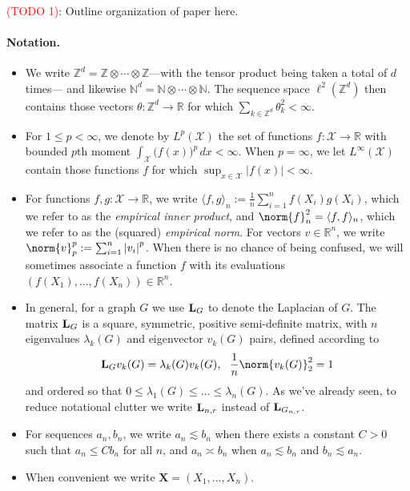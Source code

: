 \documentclass{article}
\newcommand{\Reals}{\mathbb{R}}
\newcommand{\abs}[1]{\left \lvert #1 \right \rvert}
\newcommand{\1}{\mathbf{1}}
\newcommand{\Lap}{{\bf L}}
\newcommand{\Xset}{\mathcal{X}}
\newcommand{\Leb}{L}
\newcommand{\dotp}[2]{\langle #1, #2 \rangle}
\theoremstyle{alden}
\theoremstyle{aldenthm}
\theoremstyle{definition}
\theoremstyle{remark}
\begin{document}
\textcolor{red}{(TODO 1)}: Outline organization of paper here. 

\paragraph{Notation.}
\begin{itemize}
	\item We write $\mathbb{Z}^d = \mathbb{Z} \otimes \cdots \otimes \mathbb{Z}$---with the tensor product being taken a total of $d$ times--- and likewise $\mathbb{N}^d = \mathbb{N} \otimes \cdots \otimes \mathbb{N}$. The sequence space $\ell^2(\mathbb{Z}^d)$ then contains those vectors $\theta: \mathbb{Z}^d \to \Reals$ for which $\sum_{k \in \mathbb{Z}^d} \theta_k^2 < \infty$. 
	\item For $1 \leq p < \infty$, we denote by $\Leb^p(\Xset)$ the set of functions $f:\Xset \to \Reals$ with bounded $p$th moment $\int_{\Xset} \bigl(f(x)\bigr)^p \,dx < \infty$. When $p = \infty$, we let $\Leb^{\infty}(\Xset)$ contain those functions $f$ for which $\sup_{x \in \Xset} |f(x)| < \infty$.
	\item For functions $f,g: \Xset \to \Reals$, we write $\dotp{f}{g}_n := \frac{1}{n}\sum_{i = 1}^{n} f(X_i) g(X_i)$, which we refer to as the \emph{empirical inner product}, and $\norm{f}_n^2 = \dotp{f}{f}_n$, which we refer to as the (squared) \emph{empirical norm}. For vectors $v \in \Reals^n$, we write $\norm{v}_p^p := \sum_{i = 1}^{n} \abs{v_i}^p$. When there is no chance of being confused, we will sometimes associate a function $f$ with its evaluations $(f(X_1),\ldots,f(X_n)) \in \Reals^n$.
	\item In general, for a graph $G$ we use $\Lap_G$ to denote the Laplacian of $G$. The matrix $\Lap_G$ is a square, symmetric, positive semi-definite matrix, with $n$ eigenvalues $\lambda_k(G)$ and eigenvector $v_k(G)$ pairs, defined according to
	\begin{equation*}
	\Lap_G v_k(G) = \lambda_k(G) v_k(G), ~~\frac{1}{n} \norm{v_k(G)}_2^2 = 1 
	\end{equation*}
	and ordered so that $0 \leq \lambda_1(G) \leq \ldots \leq \lambda_n(G)$. As we've already seen, to reduce notational clutter we write $\Lap_{n,r}$ instead of $\Lap_{G_{n,r}}$. 
	\item For sequences $a_n, b_n$, we write $a_n \lesssim b_n$ when there exists a constant $C > 0$ such that $a_n \leq C b_n$ for all $n$, and $a_n \asymp b_n$ when $a_n \lesssim b_n$ and $b_n \lesssim a_n$. 
	\item When convenient we write $\mathbf{X} = (X_1,\ldots,X_n)$. 
\end{itemize}
\end{document}
